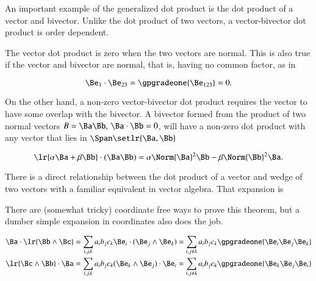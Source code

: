 An important example of the generalized dot product is the dot product of a vector and bivector.
Unlike the dot product of two vectors, a vector-bivector dot product is order dependent.

The vector dot product is zero when the two vectors are normal.
This is also true if the vector and bivector are normal, that is, having no common factor, as in

\begin{equation}\label{eqn:generalizedDot:661}
\Be_1 \cdot \Be_{23} = \gpgradeone{ \Be_{123} } = 0.
\end{equation}

On the other hand, a non-zero vector-bivector dot product requires the vector to have some overlap with the bivector.
A bivector formed from the product of two normal vectors \( B = \Ba \Bb, \, \Ba \cdot \Bb = 0 \), will have a non-zero dot product with any vector that lies in \( \Span \setlr{ \Ba, \Bb} \)

\begin{dmath}\label{eqn:generalizedDot:681}
\lr{ \alpha \Ba + \beta \Bb } \cdot (\Ba\Bb)
=
\alpha \Norm{\Ba}^2 \Bb - \beta \Norm{\Bb}^2 \Ba.
\end{dmath}

There is a direct relationship between the
dot product of a vector and wedge of two vectors with a familiar equivalent in  vector algebra.
That expansion is


There are (somewhat tricky) coordinate free ways to prove this theorem, but a dumber simple expansion in coordinates also does the job.

\begin{dmath}\label{eqn:gradeselectionProblems:681}
\begin{aligned}
\Ba \cdot \lr{ \Bb \wedge \Bc } &= \sum_{i, j, k} a_i b_j c_k \Be_i \cdot (\Be_j \wedge \Be_k)
= \sum_{i, j \ne k} a_i b_j c_k \gpgradeone{ \Be_i \Be_j \Be_k }
\\
\lr{ \Bc \wedge \Bb } \cdot \Ba &= \sum_{i, j, k} a_i b_j c_k (\Be_k \wedge \Be_j) \cdot \Be_i
= \sum_{i, j \ne k} a_i b_j c_k \gpgradeone{ \Be_k \Be_j \Be_i }
\end{aligned}
\end{dmath}

